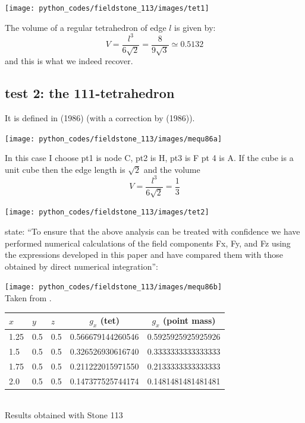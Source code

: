 \begin{center}
\texttt{[image: python\_codes/fieldstone\_113/images/tet1]}
\end{center}

The volume of a regular tetrahedron of edge $l$ is given by:
\[
V=\frac{l^3}{6\sqrt{2}} = \frac{8}{9\sqrt{3}} \simeq 0.5132
\]
and this is what we indeed recover.


\subsection*{test 2: the 111-tetrahedron}

It is defined in \textcite{mequ86} (1986) (with a correction by \textcite{camq86} (1986)).

\begin{center}
\texttt{[image: python\_codes/fieldstone\_113/images/mequ86a]}
\end{center}

In this case I choose pt1 is node C, pt2 is H, pt3 is F pt 4 is A.
If the cube is a unit cube then the edge length is $\sqrt{2}$ and the volume
\[
V=\frac{l^3}{6\sqrt{2}} = \frac13
\]

\begin{center}
\texttt{[image: python\_codes/fieldstone\_113/images/tet2]}
\end{center}

\textcite{mequ86} state: ``To ensure that the above analysis can be treated
with confidence we have performed numerical calculations of the field components Fx, Fy, and 
Fz using the expressions developed in this paper and
have compared them with those obtained by direct numerical integration'':
\begin{center}
\texttt{[image: python\_codes/fieldstone\_113/images/mequ86b]}\\
{\captionfont Taken from \textcite{mequ86}.}
\end{center}

\begin{center}
\begin{tabular}{lllcc}
\hline
$x$ & $y$ & $z$ & $g_x$ (tet) & $g_x$ (point mass) \\
\hline
\hline
1.25 & 0.5 & 0.5 &  0.566679144260546  & 0.5925925925925926 \\
1.5  & 0.5 & 0.5 &  0.326526930616740  & 0.3333333333333333 \\
1.75 & 0.5 & 0.5 &  0.211222015971550  & 0.2133333333333333 \\
2.0  & 0.5 & 0.5 &  0.147377525744174  & 0.1481481481481481 \\
\hline
\end{tabular}\\
Results obtained with Stone 113
\end{center}

